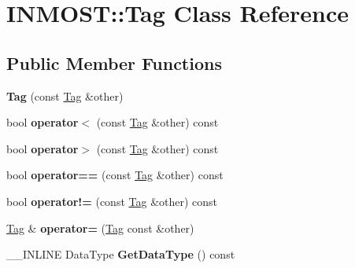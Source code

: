 \hypertarget{classINMOST_1_1Tag}{\section{I\-N\-M\-O\-S\-T\-:\-:Tag Class Reference}
\label{classINMOST_1_1Tag}
}
\subsection*{Public Member Functions}
\begin{DoxyCompactItemize}
\item 
\hypertarget{classINMOST_1_1Tag_a76f39e35a89e23996215d11344712305}{{\bfseries Tag} (const \hyperlink{classINMOST_1_1Tag}{Tag} \&other)}\label{classINMOST_1_1Tag_a76f39e35a89e23996215d11344712305}

\item 
\hypertarget{classINMOST_1_1Tag_a846728fecce1eaa7f3573694ee54cfb4}{bool {\bfseries operator$<$} (const \hyperlink{classINMOST_1_1Tag}{Tag} \&other) const }\label{classINMOST_1_1Tag_a846728fecce1eaa7f3573694ee54cfb4}

\item 
\hypertarget{classINMOST_1_1Tag_ae52dd043a4cb4cbe0aafefd304604e9c}{bool {\bfseries operator$>$} (const \hyperlink{classINMOST_1_1Tag}{Tag} \&other) const }\label{classINMOST_1_1Tag_ae52dd043a4cb4cbe0aafefd304604e9c}

\item 
\hypertarget{classINMOST_1_1Tag_aee3e7bd565322c36d6e4babeabccad08}{bool {\bfseries operator==} (const \hyperlink{classINMOST_1_1Tag}{Tag} \&other) const }\label{classINMOST_1_1Tag_aee3e7bd565322c36d6e4babeabccad08}

\item 
\hypertarget{classINMOST_1_1Tag_aebfdb3de0a85dfd92232e68cb763b514}{bool {\bfseries operator!=} (const \hyperlink{classINMOST_1_1Tag}{Tag} \&other) const }\label{classINMOST_1_1Tag_aebfdb3de0a85dfd92232e68cb763b514}

\item 
\hypertarget{classINMOST_1_1Tag_a826d9625e7f39ef4916f5fb6878cd048}{\hyperlink{classINMOST_1_1Tag}{Tag} \& {\bfseries operator=} (\hyperlink{classINMOST_1_1Tag}{Tag} const \&other)}\label{classINMOST_1_1Tag_a826d9625e7f39ef4916f5fb6878cd048}

\item 
\hypertarget{classINMOST_1_1Tag_a2a6d8f1e2efab36e317c7aa9467d18bb}{\-\_\-\-\_\-\-I\-N\-L\-I\-N\-E Data\-Type {\bfseries Get\-Data\-Type} () const }\label{classINMOST_1_1Tag_a2a6d8f1e2efab36e317c7aa9467d18bb}


\end{DoxyCompactItemize}

